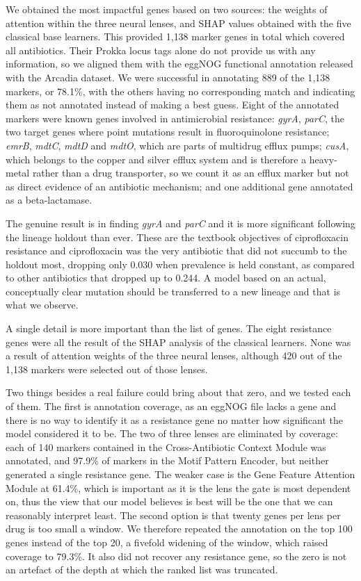 \documentclass[journal]{IEEEtran}
\begin{document}
We obtained the most impactful genes based on two sources: the weights of attention
within the three neural lenses, and SHAP values obtained with the five classical base
learners. This provided 1{,}138 marker genes in total which covered all antibiotics.
Their Prokka \cite{seemann2014prokka} locus tags alone do not provide us with any
information, so we aligned them with the eggNOG \cite{huertacepas2019eggnog}
functional annotation released with the Arcadia dataset. We were
successful in annotating 889 of the 1{,}138 markers, or 78.1\%, with the others
having no corresponding match and indicating them as not annotated instead of making
a best guess. Eight of the annotated markers were known genes involved in
antimicrobial resistance: \textit{gyrA}, \textit{parC}, the two target genes where
point mutations result in fluoroquinolone resistance; \textit{emrB}, \textit{mdtC},
\textit{mdtD} and \textit{mdtO}, which are parts of multidrug efflux pumps;
\textit{cusA}, which belongs to the copper and silver efflux system and is therefore
a heavy-metal rather than a drug transporter, so we count it as an efflux marker but
not as direct evidence of an antibiotic mechanism; and one additional gene annotated
as a beta-lactamase.

The genuine result is in finding \textit{gyrA} and \textit{parC} and it is more
significant following the lineage holdout than ever. These are the textbook
objectives of ciprofloxacin resistance and ciprofloxacin was the very antibiotic that
did not succumb to the holdout most, dropping only 0.030 when prevalence is held
constant, as compared to other antibiotics that dropped up to 0.244. A model based on
an actual, conceptually clear mutation should be transferred to a new lineage and
that is what we observe.

A single detail is more important than the list of genes. The eight resistance genes
were all the result of the SHAP analysis of the classical learners. None was a result
of attention weights of the three neural lenses, although 420 out of the 1{,}138
markers were selected out of those lenses.

Two things besides a real failure could bring about that zero, and we tested each of
them. The first is annotation coverage, as an eggNOG file lacks a gene and there is
no way to identify it as a resistance gene no matter how significant the model
considered it to be. The two of three lenses are eliminated by coverage: each of 140
markers contained in the Cross-Antibiotic Context Module was annotated, and 97.9\% of
markers in the Motif Pattern Encoder, but neither generated a single resistance gene.
The weaker case is the Gene Feature Attention Module at 61.4\%, which is important as
it is the lens the gate is most dependent on, thus the view that our model believes
is best will be the one that we can reasonably interpret least. The second option is
that twenty genes per lens per drug is too small a window. We therefore repeated the
annotation on the top 100 genes instead of the top 20, a fivefold widening of the
window, which raised coverage to 79.3\%. It also did not recover any resistance gene,
so the zero is not an artefact of the depth at which the ranked list was truncated.
\end{document}
